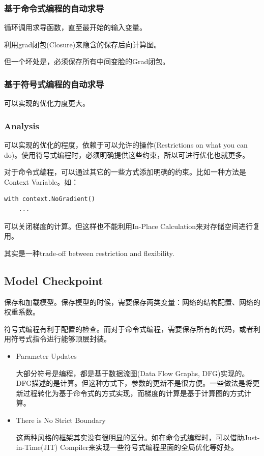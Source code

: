 \subsubsection{基于命令式编程的自动求导}
循环调用求导函数，直至最开始的输入变量。

利用grad闭包(Closure)来隐含的保存后向计算图。

但一个坏处是，必须保存所有中间变脸的Grad闭包。

\subsubsection{基于符号式编程的自动求导}

可以实现的优化力度更大。

\subsubsection{Analysis}

可以实现的优化的程度，依赖于可以允许的操作(Restrictions on what you can do)。使用符号式编程时，必须明确提供这些约束，所以可进行优化也就更多。

对于命令式编程，可以通过其它的一些方式添加明确的约束。比如一种方法是Context Variable。如：
\begin{verbatim}
with context.NoGradient()
    ...
\end{verbatim}
可以关闭梯度的计算。但这样也不能利用In-Place Calculation来对存储空间进行复用。

其实是一种trade-off between restriction and flexibility.

\subsection{Model Checkpoint}

保存和加载模型。保存模型的时候，需要保存两类变量：网络的结构配置、网络的权重系数。

符号式编程有利于配置的检查。而对于命令式编程，需要保存所有的代码，或者利用符号式指令进行能够顶层封装。

\begin{itemize}
\item Parameter Updates

大部分符号是编程，都是基于数据流图(Data Flow Graphs, DFG)实现的。DFG描述的是计算。但这种方式下，参数的更新不是很方便。一些做法是将更新过程转化为基于命令式的方式实现，而梯度的计算是基于计算图的方式计算。

\item There is No Strict Boundary

这两种风格的框架其实没有很明显的区分。如在命令式编程时，可以借助Just-in-Time(JIT) Compiler来实现一些符号式编程里面的全局优化等好处。
 
\end{itemize}


